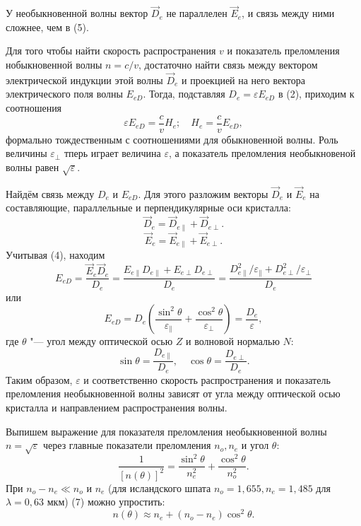 \documentclass[10pt, a4paper]{article}
\begin{document}
У необыкновенной волны вектор $\vec D_e$ не параллелен $\vec E_e$, и связь между ними сложнее, чем в (5).

Для того чтобы найти скорость распространения $v$ и показатель преломления нобыкновенной волны $n = c / v$, достаточно найти связь между вектором электрической индукции этой волны $\vec D_e$ и проекцией на него вектора электрического поля волны $E_{eD}$. Тогда, подставляя $D_e = \varepsilon E_{eD}$ в (2), приходим к соотношения
\[
	\varepsilon E_{eD} = \frac{c}{v} H_e; \quad H_e = \frac{c}{v} E_{eD},
\]
формально тождественным с соотношениями для обыкновенной волны. Роль величины $\varepsilon_\perp$ тперь играет величина $\varepsilon$, а показатель преломления необыкновеной волны равен $\sqrt{\varepsilon}$.

Найдём связь между $D_e$ и $E_{eD}$. Для этого разложим векторы $\vec D_e$ и $\vec E_e$ на составляющие, параллельные и перпендикулярные оси кристалла:
\[
	\vec D_e = \vec D_{e \parallel} + \vec D_{e \perp}.
\]
\[
	\vec E_e = \vec E_{e \parallel} + \vec E_{e \perp}.
\]
Учитывая (4), находим
\[
	E_{eD} = \frac{\vec E_e \vec D_e}{D_e} = \frac{E_{e \parallel} D_{e \parallel} + E_{e \perp} D_{e \perp}}{D_e} = \frac{D^2_{e \parallel} / \varepsilon_\parallel + D^2_{e \perp} / \varepsilon_\perp}{D_e}
\]
или 
\[
E_{eD} = D_e \left( \frac{\sin^2{\theta}}{\varepsilon_\parallel} + \frac{\cos^2{\theta}}{\varepsilon_\perp} \right) = \frac{D_e}{\varepsilon},
\]
где $\theta$ "--- угол между оптической осью $Z$ и волновой нормалью $N$:
\begin{equation}
	\sin \theta = \frac{D_{e \parallel}}{D_e}, \quad \cos \theta = \frac{D_{e \perp}}{D_e}.
\end{equation}
Таким образом, $\varepsilon$ и соответственно скорость распространения и показатель преломления необыкновенной волны зависят от угла между оптической осью кристалла и   направлением распространения волны.

Выпишем выражение для показателя преломления необыкновенной волны $n = \sqrt \varepsilon$ через главные показатели преломления $n_o, n_e$ и угол $\theta$:
\begin{equation}
	\frac{1}{\left[ n(\theta) \right] ^ 2} = \frac{\sin^2 \theta}{n^2_e} + \frac{\cos^2 \theta}{n^2_o}.
\end{equation}
При $n_o - n_e \ll n_o$ и $n_e$ (для исландского шпата $n_o = 1,655, n_e = 1,485$ для $\lambda = 0,63$ мкм) (7) можно упростить:
\begin{equation}
	n(\theta) \approx n_e + (n_o - n_e) \cos^2 \theta.
\end{equation}
\end{document}
